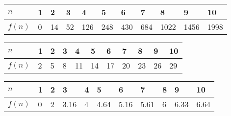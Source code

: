 \documentclass[12pt,a4paper]{article}
\begin{document}
\begin{table}[H]
\begin{center}
	{\footnotesize \begin{tabular}{|C{1.8cm}|C{0.75cm}|C{0.75cm}|C{0.75cm}|C{0.75cm}|C{0.75cm}|C{0.75cm}|C{0.75cm}|C{0.75cm}|C{0.75cm}|C{0.75cm}|}
	\hline
		\rule{0pt}{2.5ex}$n$& 1 & 2 & 3 & 4 & 5 & 6 & 7 & 8 & 9 & 10 \\
		\hline
		\rule{0pt}{2.5ex}$f(n)$& 0 & 14 & 52 & 126 & 248 & 430 & 684 & 1022 & 1456 & 1998 \\
	\hline
	\end{tabular}}
\end{center}
\begin{center}
	{\footnotesize \begin{tabular}{|C{1.8cm}|C{0.75cm}|C{0.75cm}|C{0.75cm}|C{0.75cm}|C{0.75cm}|C{0.75cm}|C{0.75cm}|C{0.75cm}|C{0.75cm}|C{0.75cm}|}
	\hline
		\rule{0pt}{2.5ex}$n$& 1 & 2 & 3 & 4 & 5 & 6 & 7 & 8 & 9 & 10 \\
		\hline
		\rule{0pt}{2.5ex}$f(n)$& 2 & 5 & 8 & 11 & 14 & 17 & 20 & 23 & 26 & 29 \\
	\hline
	\end{tabular}}
\end{center}
\begin{center}
	{\footnotesize \begin{tabular}{|C{1.8cm}|C{0.75cm}|C{0.75cm}|C{0.75cm}|C{0.75cm}|C{0.75cm}|C{0.75cm}|C{0.75cm}|C{0.75cm}|C{0.75cm}|C{0.75cm}|}
	\hline
		\rule{0pt}{2.5ex}$n$& 1 & 2 & 3 & 4 & 5 & 6 & 7 & 8 & 9 & 10 \\
		\hline
		\rule{0pt}{2.5ex}$f(n)$& 0 & 2 & 3.16 & 4 & 4.64 & 5.16 & 5.61 & 6 & 6.33 & 6.64 \\
	\hline
	\end{tabular}}
\end{center}
\begin{center}

\end{center}
\end{table}
\end{document}
